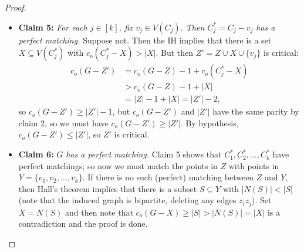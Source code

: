 \begin{proof}
\begin{itemize}[nolistsep]
	\item \textbf{Claim 5:} \emph{For each \( j \in [k] \), fix \( v_{j} \in V(C_{j}) \). Then \(C_{j}^{\ast} = C_{j} - v_{j}  \) has a perfect matching.} Suppose not. Then the IH implies that there is a set \( X \subseteq V(C^{\ast} _{j}) \) with \( c_{o} (C^{\ast} _{j} - X) > |X| \). But then \( Z' = Z \cup X \cup \{ v_{j}  \}  \) is critical:
		\begin{align*}
			c_{o} (G - Z') &= c_{o} (G - Z) - 1 + c_{o} (C^{\ast} _{j}  - X  ) \\
				       &> c_{o}(G - Z)  - 1 + |X| \\
				       &= |Z| - 1 + |X| = |Z'| - 2,
		\end{align*}
		so \( c_{o} (G - Z') \geq |Z'| - 1 \), but \( c_{o} (G - Z') \) and \( |Z'| \) have the same parity by claim 2, so we must have \( c_{o} (G - Z') \geq |Z'| \). By hypothesis, \( c_{o} (G - Z') \leq |Z'| \), so \( Z' \) is critical.
	\item \textbf{Claim 6:} \emph{\( G \) has a perfect matching.} Claim 5 shows that \( C^{\ast} _1, C^{\ast} _2, \hdots , C^{\ast} _{k}  \) have perfect matchings; so now we must match the points in \( Z \) with points in \(Y = \{ v_1, v_2, \hdots , v_{k}  \}  \). If there is no such (perfect) matching between \( Z \) and \( Y \), then Hall's theorem implies that there is a subset \( S \subseteq Y \) with \( |N(S)| < |S| \) (note that the induced graph is bipartite, deleting any edges \( z_{i} z_{j}  \)). Set \( X = N(S) \) and then note that \( c_{o} (G - X) \geq |S| > |N(S)| = |X| \) is a contradiction and the proof is done. \qedhere
\end{itemize}
\end{proof}
